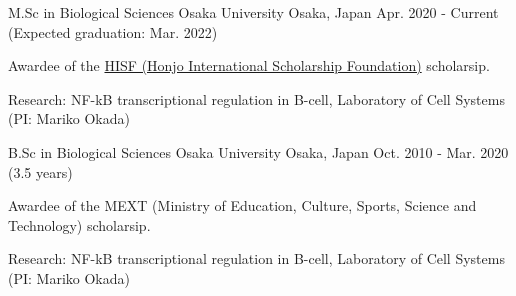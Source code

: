 

\begin{cventries}

  \cventry
    {M.Sc in Biological Sciences} %
    {Osaka University} %
    {Osaka, Japan} %
    {Apr. 2020 - Current (Expected graduation: Mar. 2022)} %
    {
      \begin{cvitems} %
        \item {Awardee of the \href{https://www.hisf.or.jp/en/}{HISF (Honjo International Scholarship Foundation)} scholarsip.} 
        \item {Research: NF-kB transcriptional regulation in B-cell, Laboratory of Cell Systems (PI: Mariko Okada)}
      \end{cvitems}
    }
  \cventry
    {B.Sc in Biological Sciences} %
    {Osaka University} %
    {Osaka, Japan} %
    {Oct. 2010 - Mar. 2020 (3.5 years)} %
    {
      \begin{cvitems} %
        \item {Awardee of the MEXT (Ministry of Education, Culture, Sports, Science and Technology) scholarsip.}
        \item {Research: NF-kB transcriptional regulation in B-cell, Laboratory of Cell Systems (PI: Mariko Okada)}
      \end{cvitems}
    }

\end{cventries}
